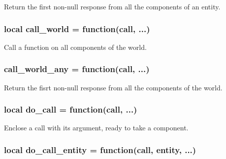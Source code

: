 Return the first non-\/null response from all the components of an entity. 

\hypertarget{controller_8lua_a063db58d193e393e992dc02d752b6abb}{
\subsubsection[{call\-\_\-world}]{\setlength{\rightskip}{0pt plus 5cm}local call\-\_\-world = function(call, ...)}}\label{controller_8lua_a063db58d193e393e992dc02d752b6abb}


Call a function on all components of the world. 

\hypertarget{controller_8lua_a496c48185e626830e2a81b29158369e7}{
\subsubsection[{call\-\_\-world\-\_\-any}]{\setlength{\rightskip}{0pt plus 5cm}call\-\_\-world\-\_\-any = function(call, ...)}}\label{controller_8lua_a496c48185e626830e2a81b29158369e7}


Return the fisrt non-\/null response from all the components of the world. 

\hypertarget{controller_8lua_a97132b7af7122a75e92b9452712353b9}{
\subsubsection[{do\-\_\-call}]{\setlength{\rightskip}{0pt plus 5cm}local do\-\_\-call = function(call, ...)}}\label{controller_8lua_a97132b7af7122a75e92b9452712353b9}


Enclose a call with its argument, ready to take a component. 

\hypertarget{controller_8lua_a936e98b963e63dd16d2d10668a548536}{
\subsubsection[{do\-\_\-call\-\_\-entity}]{\setlength{\rightskip}{0pt plus 5cm}local do\-\_\-call\-\_\-entity = function(call, entity, ...)}}\label{controller_8lua_a936e98b963e63dd16d2d10668a548536}


